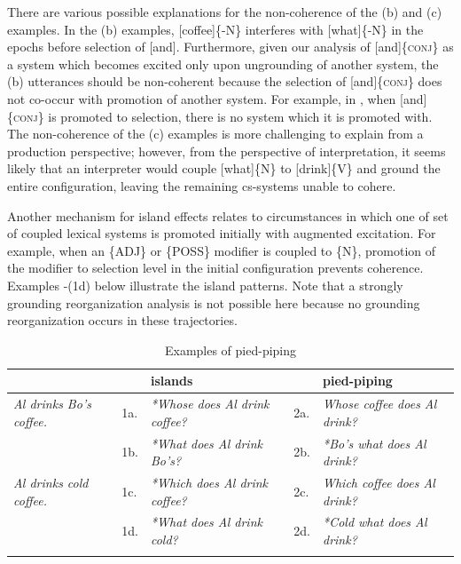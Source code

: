   There are various possible explanations for the non-coherence of the (b) and (c) examples. In the (b) examples, [coffee]\{-N\} interferes with [what]\{-N\} in the epochs before selection of [and]. Furthermore, given our analysis of [and]\{\textsc{conj}\} as a system which becomes excited only upon ungrounding of another system, the (b) utterances should be non-coherent because the selection of [and]\{\textsc{conj}\} does not co-occur with promotion of another system. For example, in , when [and]\{\textsc{conj}\} is promoted to selection, there is no system which it is promoted with. The non-coherence of the (c) examples is more challenging to explain from a production perspective; however, from the perspective of interpretation, it seems likely that an interpreter would couple [what]\{N\} to [drink]\{V\} and ground the entire configuration, leaving the remaining cs-systems unable to cohere.

Another mechanism for island effects relates to circumstances in which one of set of coupled lexical systems is promoted initially with augmented excitation. For example, when an \{ADJ\} or \{POSS\} modifier is coupled to \{N\}, promotion of the modifier to selection level in the initial configuration prevents coherence. Examples -(1d) below illustrate the island patterns. Note that a strongly grounding reorganization analysis is not possible here because no grounding reorganization occurs in these trajectories.

\begin{table}
\begin{tabularx}{\textwidth}{QlQlQ} 
\lsptoprule
&& islands && pied-piping\\
\midrule
\textit{Al drinks Bo’s coffee.}  & 1a. & \textit{*Whose does Al drink coffee?} & 2a. &  \textit{Whose coffee does Al drink?} \\
				 &  1b. &  \textit{*What does Al drink Bo’s?}     & 2b. &  \textit{*Bo’s what does Al drink?}\\
\tablevspace 
\textit{Al drinks cold coffee.} & 1c.&   \textit{*Which does Al drink coffee?} & 2c. &  \textit{Which coffee does Al drink?} \\
				&   1d.&   \textit{*What does Al drink cold?}    & 2d. &  \textit{*Cold what does Al drink?}\\
\lspbottomrule
\end{tabularx}
\caption{Examples of pied-piping}\label{tab:7:7} 
\end{table}

